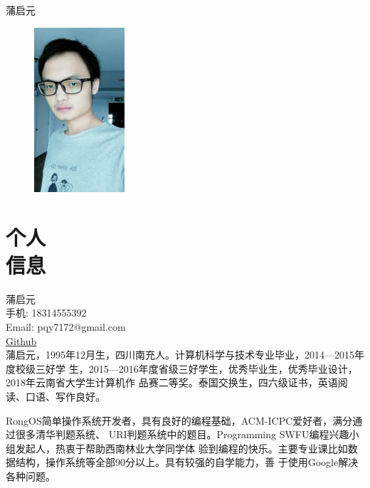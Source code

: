 \documentclass[margin,line,a4paper]{resume}
\begin{document}
{\sc \Large 蒲启元}
\begin{resume}
    \vspace{0.5cm}
    \begin{figure}
        \vspace{-1cm}
       \begin{center}
       \includegraphics[width=0.3\textwidth]{me1}
       \end{center}
        \vspace{-1cm}
    \end{figure}
    


    \section{\mysidestyle 个人\\信息}%
    蒲启元 \\
    手机: 18314555392 \\
    Email: pqy7172@gmail.com \\
    \href{https://github.com/Puqiyuan}{Github}\\    

    蒲启元，1995年12月生，四川南充人。计算机科学与技术专业毕业，2014---2015年度校级三好学
    生，2015---2016年度省级三好学生，优秀毕业生，优秀毕业设计，2018年云南省大学生计算机作
    品赛二等奖。泰国交换生，四六级证书，英语阅读、口语、写作良好。

    RongOS简单操作系统开发者，具有良好的编程基础，ACM-ICPC爱好者，满分通过很多清华判题系统、
    URI判题系统中的题目。Programming SWFU编程兴趣小组发起人，热衷于帮助西南林业大学同学体
    验到编程的快乐。主要专业课比如数据结构，操作系统等全部90分以上。具有较强的自学能力，善
    于使用Google解决各种问题。
    


\end{resume}
\end{document}
